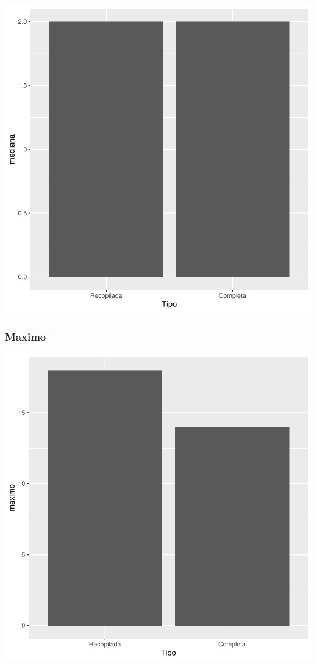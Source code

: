 \documentclass{article}
\begin{document}
\includegraphics{seguimento2-080}

\subsubsection{Maximo}

\includegraphics{seguimento2-081}
\end{document}
